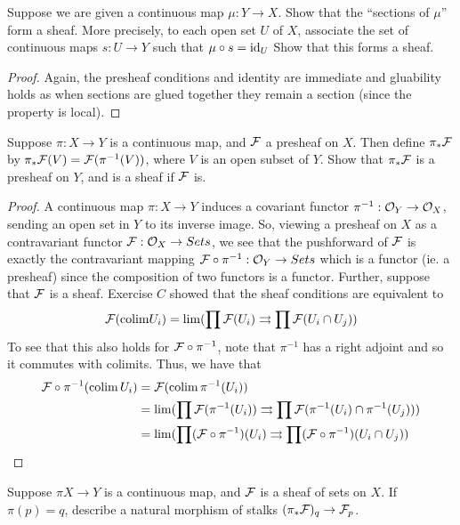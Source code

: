 \begin{exercise} Suppose we are given a continuous map $\mu: Y \to X$. Show that the ``sections of $\mu$'' form a sheaf. More precisely, to each open set $U$ of $X$, associate the set of continuous maps $s: U \to Y$ such that $\mu \circ s = \text{id}_U$ Show that this forms a sheaf. 
\end{exercise}

\begin{proof}
    Again, the presheaf conditions and identity are immediate and gluability holds as when sections are glued together they remain a section (since the property is local). 
\end{proof}

\begin{exercise}
    Suppose $\pi: X \to Y$ is a continuous map, and $\mathcal{F}$ a presheaf on $X$. Then define $\pi_*\mathcal{F}$ by $\pi_*\mathcal{F}(V) = \mathcal{F}(\pi^{-1}(V))$, where $V$ is an open subset of $Y$. Show that $\pi_*\mathcal{F}$ is a presheaf on $Y$, and is a sheaf if $\mathcal{F}$ is.
\end{exercise}

\begin{proof}
    A continuous map $\pi: X \to Y$ induces a covariant functor $\pi^{-1}: \mathcal{O}_Y \to \mathcal{O}_X$, sending an open set in $Y$ to its inverse image. So, viewing a presheaf on $X$ as a contravariant functor $\mathcal{F}: \mathcal{O}_X \to Sets$, we see that the pushforward of $\mathcal{F}$ is exactly the contravariant mapping $\mathcal{F} \circ \pi^{-1}: \mathcal{O}_Y \to Sets$ which is a functor (ie. a presheaf) since the composition of two functors is a functor. Further, suppose that $\mathcal{F}$ is a sheaf. Exercise $C$ showed that the sheaf conditions are equivalent to 
    \[ \mathcal{F}(\text{colim}U_i) = \lim(\prod \mathcal{F}(U_i) \rightrightarrows \prod \mathcal{F}(U_i \cap U_j)) \] 
    To see that this also holds for $\mathcal{F} \circ \pi^{-1}$, note that $\pi^{-1}$ has a right adjoint and so it commutes with colimits. Thus, we have that 
    \begin{align*}
        \mathcal{F} \circ \pi^{-1}(\text{colim}\, U_i) & = \mathcal{F}(\text{colim}\,\pi^{-1}(U_i)) \\ 
        & = \lim(\prod \mathcal{F}( \pi^{-1}(U_i)) \rightrightarrows \prod \mathcal{F}(\pi^{-1}(U_i) \cap \pi^{-1}(U_j))) \\ 
        & = \lim(\prod (\mathcal{F} \circ \pi^{-1})(U_i) \rightrightarrows \prod (\mathcal{F}\circ \pi^{-1})(U_i \cap U_j))
    \end{align*}
\end{proof}

\begin{exercise}
    Suppose $\pi X \to Y$ is a continuous map, and $\mathcal{F}$ is a sheaf of sets on $X$. If $\pi(p)= q$, describe a natural morphism of stalks $(\pi_*\mathcal{F})_q \to \mathcal{F}_p$. 
\end{exercise}

